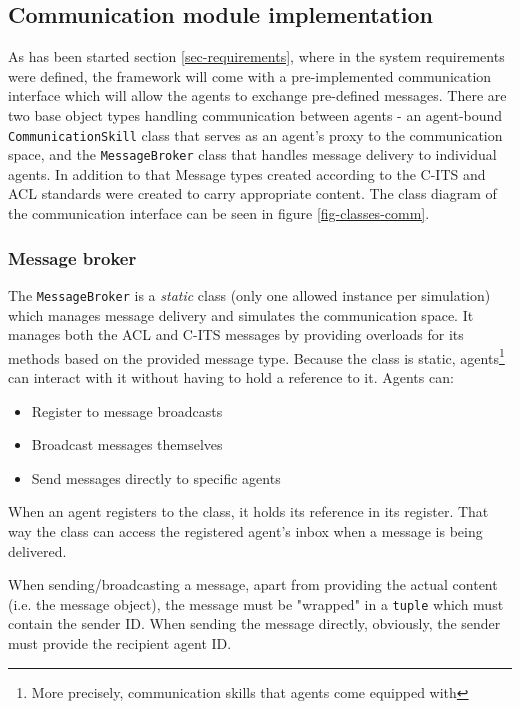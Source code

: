 \documentclass[0main.tex]{subfiles}
\begin{document}
\subsection{Communication module implementation}

As has been started section \ref{sec-requirements}, where in the system requirements were
defined, the framework will come with a pre-implemented communication interface which will 
allow the agents to exchange pre-defined messages. There are two
base object types handling communication between agents - an agent-bound
\texttt{CommunicationSkill} class that serves as an agent's proxy to the communication space,
and the \texttt{MessageBroker} class that handles message delivery to individual agents. In
addition to that Message types created according to the C-ITS and ACL standards were created to
carry appropriate content. The class diagram of the communication interface can be seen in
figure \ref{fig-classes-comm}.

\subsubsection{Message broker}

The \texttt{MessageBroker} is a \emph{static} class (only one allowed instance per 
simulation) which manages message delivery and simulates the communication space. 
It manages both the ACL and C-ITS messages by providing overloads for its methods 
based on the provided message type. Because the class is static, agents\footnote{More precisely,
communication skills that agents come equipped with} can interact with it without 
having to hold a reference to it. Agents can:

\begin{itemize}
    \item Register to message broadcasts
    \item Broadcast messages themselves 
    \item Send messages directly to specific agents
\end{itemize}

When an agent registers to the class, it holds its reference in its register. 
That way the class can access the registered agent's inbox when a message is 
being delivered.

When sending/broadcasting a message, apart from providing the actual content (i.e. 
the message object), the message must be "wrapped" in a \texttt{tuple} which must 
contain the sender ID. When sending the message directly, obviously, the sender must 
provide the recipient agent ID. 
\end{document}
